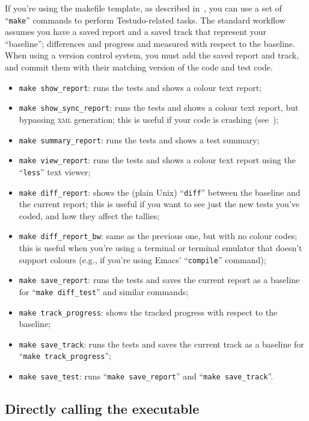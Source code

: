 \documentclass[twoside, a4paper, article]{memoir}
\begin{document}
If you're using the makefile template, as described
in~, you can use a set of ``\texttt{make}''
commands to perform Testudo-related tasks.  The standard workflow assumes you
have a saved report and a saved track that represent your ``baseline'';
differences and progress and measured with respect to the baseline.  When using
a version control system, you must add the saved report and track, and commit
them with their matching version of the code and test code.
\begin{itemize}
\item \texttt{make show\_report}: runs the tests and shows a colour text report;
\item \texttt{make show\_sync\_report}: runs the tests and shows a colour text
  report, but bypassing \textsc{xml} generation; this is useful if your code is
  crashing (see~);
\item \texttt{make summary\_report}: runs the tests and shows a test summary;
\item \texttt{make view\_report}: runs the tests and shows a colour text report
  using the ``\texttt{less}'' text viewer;
\item \texttt{make diff\_report}: shows the (plain Unix) ``\texttt{diff}''
  between the baseline and the current report; this is useful if you want to
  see just the new tests you've coded, and how they affect the tallies;
\item \texttt{make diff\_report\_bw}: same as the previous one, but with no
  colour codes; this is useful when you're using a terminal or terminal
  emulator that doesn't support colours (e.g., if you're using Emacs'
  ``\texttt{compile}'' command);
\item \texttt{make save\_report}: runs the tests and saves the current report
  as a baseline for ``\texttt{make diff\_test}'' and similar commands;
\item \texttt{make track\_progress}: shows the tracked progress with respect to
  the baseline;
\item \texttt{make save\_track}: runs the tests and saves the current track as
  a baseline for ``\texttt{make track\_progress}'';
\item \texttt{make save\_test}: runs ``\texttt{make save\_report}'' and
  ``\texttt{make save\_track}''.
\end{itemize}


\subsection{Directly calling the executable}
\label{sec:directly-calling-executable}
\end{document}
